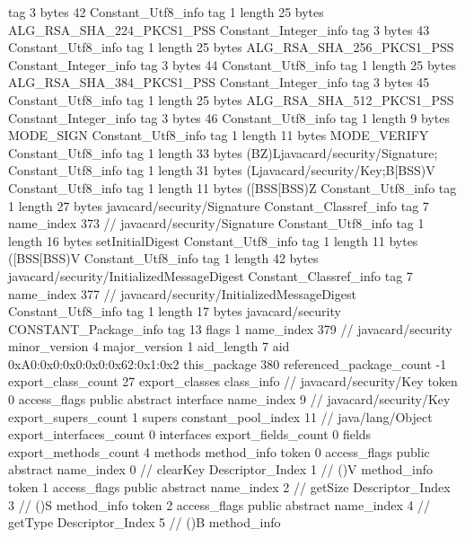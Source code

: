 {{{			tag	3
			bytes	42
		}
		Constant_Utf8_info {
			tag	1
			length	25
			bytes	ALG_RSA_SHA_224_PKCS1_PSS
		}
		Constant_Integer_info {
			tag	3
			bytes	43
		}
		Constant_Utf8_info {
			tag	1
			length	25
			bytes	ALG_RSA_SHA_256_PKCS1_PSS
		}
		Constant_Integer_info {
			tag	3
			bytes	44
		}
		Constant_Utf8_info {
			tag	1
			length	25
			bytes	ALG_RSA_SHA_384_PKCS1_PSS
		}
		Constant_Integer_info {
			tag	3
			bytes	45
		}
		Constant_Utf8_info {
			tag	1
			length	25
			bytes	ALG_RSA_SHA_512_PKCS1_PSS
		}
		Constant_Integer_info {
			tag	3
			bytes	46
		}
		Constant_Utf8_info {
			tag	1
			length	9
			bytes	MODE_SIGN
		}
		Constant_Utf8_info {
			tag	1
			length	11
			bytes	MODE_VERIFY
		}
		Constant_Utf8_info {
			tag	1
			length	33
			bytes	(BZ)Ljavacard/security/Signature;
		}
		Constant_Utf8_info {
			tag	1
			length	31
			bytes	(Ljavacard/security/Key;B[BSS)V
		}
		Constant_Utf8_info {
			tag	1
			length	11
			bytes	([BSS[BSS)Z
		}
		Constant_Utf8_info {
			tag	1
			length	27
			bytes	javacard/security/Signature
		}
		Constant_Classref_info {
			tag	7
			name_index	373		// javacard/security/Signature
		}
		Constant_Utf8_info {
			tag	1
			length	16
			bytes	setInitialDigest
		}
		Constant_Utf8_info {
			tag	1
			length	11
			bytes	([BSS[BSS)V
		}
		Constant_Utf8_info {
			tag	1
			length	42
			bytes	javacard/security/InitializedMessageDigest
		}
		Constant_Classref_info {
			tag	7
			name_index	377		// javacard/security/InitializedMessageDigest
		}
		Constant_Utf8_info {
			tag	1
			length	17
			bytes	javacard/security
		}
		CONSTANT_Package_info {
			tag	13
			flags	1
			name_index	379		// javacard/security
			minor_version	4
			major_version	1
			aid_length	7
			aid	0xA0:0x0:0x0:0x0:0x62:0x1:0x2
		}
	}
	this_package	380
	referenced_package_count	-1
	export_class_count	27
	export_classes {
		class_info {		// javacard/security/Key
			token	0
			access_flags	public abstract interface
			name_index	9		// javacard/security/Key
			export_supers_count	1
			supers {
				constant_pool_index	11		// java/lang/Object
			}
			export_interfaces_count	0
			interfaces {
			}
			export_fields_count	0
			fields {
			}
			export_methods_count	4
			methods {
				method_info {
					token	0
					access_flags	public abstract
					name_index	0		// clearKey
					Descriptor_Index	1		// ()V
				}
				method_info {
					token	1
					access_flags	public abstract
					name_index	2		// getSize
					Descriptor_Index	3		// ()S
				}
				method_info {
					token	2
					access_flags	public abstract
					name_index	4		// getType
					Descriptor_Index	5		// ()B
				}
				method_info {
}}}}}
